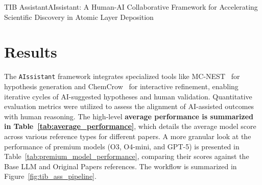 \begin{teamsubmission}{TIB Assistant}{AIssistant: A Human-AI Collaborative Framework for Accelerating Scientific Discovery in Atomic Layer Deposition}
\begin{table}[ht]
\centering
\caption{Model Performance vs. Key References.}
\label{tab:premium_model_performance}
\end{table}


\section*{Results}
The \texttt{AIssistant} framework integrates specialized tools like MC-NEST~\cite{rabby2024mc} for hypothesis generation and ChemCrow~\cite{bran2023chemcrow} for interactive refinement, enabling iterative cycles of AI-suggested hypotheses and human validation. Quantitative evaluation metrics were utilized to assess the alignment of AI-assisted outcomes with human reasoning. The high-level \textbf{average performance is summarized in Table~\ref{tab:average_performance}}, which details the average model score across various reference types for different papers. A more granular look at the performance of premium models (O3, O4-mini, and GPT-5) is presented in Table~\ref{tab:premium_model_performance}, comparing their scores against the Base LLM and Original Papers references. The workflow is summarized in Figure~\ref{fig:tib_ass_pipeline}.



\end{teamsubmission}
